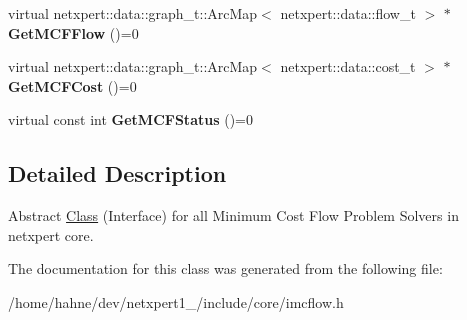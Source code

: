 \begin{DoxyCompactItemize}
\item 
virtual netxpert\+::data\+::graph\+\_\+t\+::\+Arc\+Map$<$ netxpert\+::data\+::flow\+\_\+t $>$ $\ast$ {\bfseries Get\+M\+C\+F\+Flow} ()=0\hypertarget{classnetxpert_1_1core_1_1IMinCostFlow_ac1303e3c31a2f4e2ec11e6ddc1ee0a30}{}\label{classnetxpert_1_1core_1_1IMinCostFlow_ac1303e3c31a2f4e2ec11e6ddc1ee0a30}

\item 
virtual netxpert\+::data\+::graph\+\_\+t\+::\+Arc\+Map$<$ netxpert\+::data\+::cost\+\_\+t $>$ $\ast$ {\bfseries Get\+M\+C\+F\+Cost} ()=0\hypertarget{classnetxpert_1_1core_1_1IMinCostFlow_a1262b923b11fc3b240c2e61f1e2e7f07}{}\label{classnetxpert_1_1core_1_1IMinCostFlow_a1262b923b11fc3b240c2e61f1e2e7f07}

\item 
virtual const int {\bfseries Get\+M\+C\+F\+Status} ()=0\hypertarget{classnetxpert_1_1core_1_1IMinCostFlow_a71466b0a2c494afb015197a103ec0dcc}{}\label{classnetxpert_1_1core_1_1IMinCostFlow_a71466b0a2c494afb015197a103ec0dcc}

\end{DoxyCompactItemize}


\subsection{Detailed Description}
Abstract \hyperlink{classClass}{Class} (Interface) for all Minimum Cost Flow Problem Solvers in netxpert core. 

The documentation for this class was generated from the following file\+:\begin{DoxyCompactItemize}
\item 
/home/hahne/dev/netxpert1\+\_/include/core/imcflow.\+h\end{DoxyCompactItemize}

